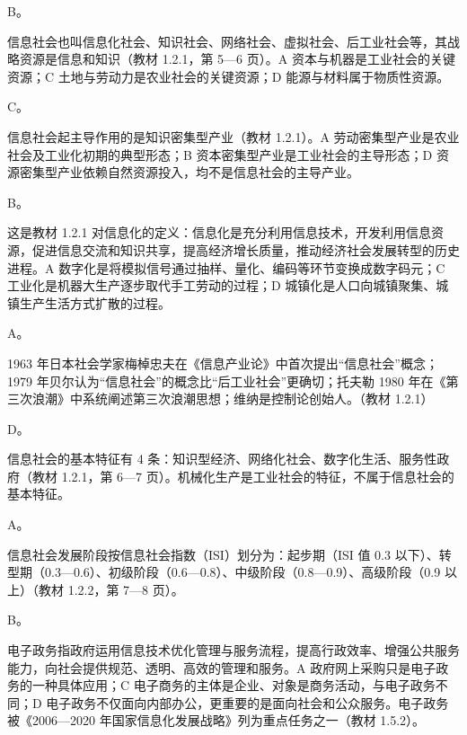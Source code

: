 \documentclass[a4paper,11pt]{article}
\begin{document}


\q B。\begin{analysis}信息社会也叫信息化社会、知识社会、网络社会、虚拟社会、后工业社会等，其战略资源是信息和知识（教材 1.2.1，第 5—6 页）。A 资本与机器是工业社会的关键资源；C 土地与劳动力是农业社会的关键资源；D 能源与材料属于物质性资源。\end{analysis}

\q C。\begin{analysis}信息社会起主导作用的是知识密集型产业（教材 1.2.1）。A 劳动密集型产业是农业社会及工业化初期的典型形态；B 资本密集型产业是工业社会的主导形态；D 资源密集型产业依赖自然资源投入，均不是信息社会的主导产业。\end{analysis}

\q B。\begin{analysis}这是教材 1.2.1 对信息化的定义：信息化是充分利用信息技术，开发利用信息资源，促进信息交流和知识共享，提高经济增长质量，推动经济社会发展转型的历史进程。A 数字化是将模拟信号通过抽样、量化、编码等环节变换成数字码元；C 工业化是机器大生产逐步取代手工劳动的过程；D 城镇化是人口向城镇聚集、城镇生产生活方式扩散的过程。\end{analysis}

\q A。\begin{analysis}1963 年日本社会学家梅棹忠夫在《信息产业论》中首次提出“信息社会”概念；1979 年贝尔认为“信息社会”的概念比“后工业社会”更确切；托夫勒 1980 年在《第三次浪潮》中系统阐述第三次浪潮思想；维纳是控制论创始人。（教材 1.2.1）\end{analysis}

\q D。\begin{analysis}信息社会的基本特征有 4 条：知识型经济、网络化社会、数字化生活、服务性政府（教材 1.2.1，第 6—7 页）。机械化生产是工业社会的特征，不属于信息社会的基本特征。\end{analysis}

\q A。\begin{analysis}信息社会发展阶段按信息社会指数（ISI）划分为：起步期（ISI 值 0.3 以下）、转型期（0.3—0.6）、初级阶段（0.6—0.8）、中级阶段（0.8—0.9）、高级阶段（0.9 以上）（教材 1.2.2，第 7—8 页）。\end{analysis}

\q B。\begin{analysis}电子政务指政府运用信息技术优化管理与服务流程，提高行政效率、增强公共服务能力，向社会提供规范、透明、高效的管理和服务。A 政府网上采购只是电子政务的一种具体应用；C 电子商务的主体是企业、对象是商务活动，与电子政务不同；D 电子政务不仅面向内部办公，更重要的是面向社会和公众服务。电子政务被《2006—2020 年国家信息化发展战略》列为重点任务之一（教材 1.5.2）。\end{analysis}
\end{document}
